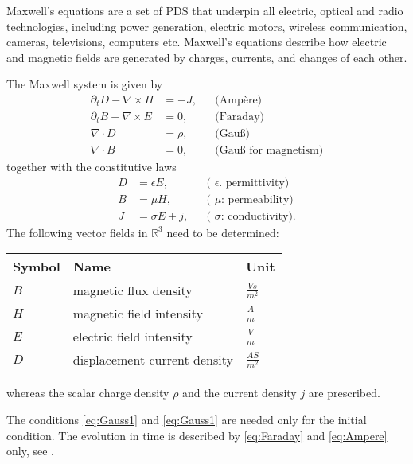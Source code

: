 \documentclass[a4paper,12pt]{article}
\theoremstyle{definition}
\theoremstyle{definition}
\begin{document}
Maxwell's equations are a set of PDS that underpin all electric, optical and radio technologies, including power generation, electric motors, wireless communication, cameras, televisions, computers etc. Maxwell's equations describe how electric and magnetic fields are generated by charges, currents, and changes of each other.

The Maxwell system is given by
\begin{subequations}
	\begin{align}
	\partial_t D - \nabla\times H &= -J, &&\text{(Ampère)} \label{eq:Ampere}\\
	\partial_t B + \nabla\times E &= 0, &&\text{(Faraday)} \label{eq:Faraday}\\
	\nabla\cdot D &= \rho, &&\text{(Gauß)} \label{eq:Gauss1}\\
	\nabla\cdot B &=0, &&\text{(Gauß for magnetism)} \label{eq:Gauss2}
	\end{align}
\end{subequations}
together with the constitutive laws
\begin{subequations}
	\begin{align}
	D &= \epsilon E, &&\text{( $\epsilon$. permittivity)}\\
	B &= \mu H, &&\text{( $\mu$: permeability)}\\
	J &= \sigma E + j, &&\text{( $\sigma$: conductivity)} .
	\end{align}
\end{subequations}
The following vector fields in $\mathbb{R}^3$ need to be determined:
\begin{center}
	\begin{tabular}{lll}
		Symbol & Name & Unit\\
		\hline
		$B$ & magnetic flux density & $\frac{Vs}{m^2}$\\
		$H$ & magnetic field intensity & $\frac{A}{m}$\\
		$E$ & electric field intensity & $\frac{V}{m}$\\
		$D$ & displacement current density & $\frac{AS}{m^2}$\\
		\hline
	\end{tabular}
\end{center}
whereas the scalar charge density $\rho$ and the current density $j$ are prescribed.

The conditions \eqref{eq:Gauss1} and \eqref{eq:Gauss1} are needed only for the
initial condition. The evolution in time is described by \eqref{eq:Faraday} and
\eqref{eq:Ampere} only, see \cite{JinBook}.
\end{document}
